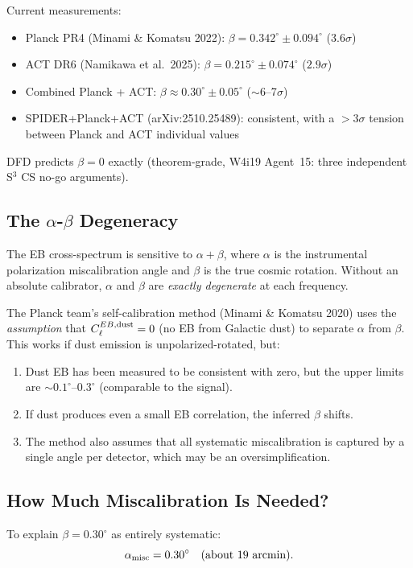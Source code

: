 \documentclass[11pt]{article}
\begin{document}
Current measurements:
\begin{itemize}
\item Planck PR4 (Minami \& Komatsu 2022): $\beta = 0.342^\circ \pm 0.094^\circ$ ($3.6\sigma$)
\item ACT DR6 (Namikawa et al.\ 2025): $\beta = 0.215^\circ \pm 0.074^\circ$ ($2.9\sigma$)
\item Combined Planck + ACT: $\beta \approx 0.30^\circ \pm 0.05^\circ$ ($\sim$6--7$\sigma$)
\item SPIDER+Planck+ACT (arXiv:2510.25489): consistent, with a $>$3$\sigma$ tension between
  Planck and ACT individual values
\end{itemize}

DFD predicts $\beta = 0$ exactly (theorem-grade, W4i19 Agent~15: three
independent S$^3$ CS no-go arguments).

\subsection{The $\alpha$-$\beta$ Degeneracy}

The EB cross-spectrum is sensitive to $\alpha + \beta$, where $\alpha$ is
the instrumental polarization miscalibration angle and $\beta$ is the
true cosmic rotation. Without an absolute calibrator, $\alpha$ and $\beta$
are \emph{exactly degenerate} at each frequency.

The Planck team's self-calibration method (Minami \& Komatsu 2020) uses
the \emph{assumption} that $C_\ell^{EB,\rm dust} = 0$ (no EB from
Galactic dust) to separate $\alpha$ from $\beta$. This works if dust
emission is unpolarized-rotated, but:
\begin{enumerate}
\item Dust EB has been measured to be consistent with zero, but the upper
  limits are $\sim 0.1^\circ$--$0.3^\circ$ (comparable to the signal).
\item If dust produces even a small EB correlation, the inferred $\beta$
  shifts.
\item The method also assumes that all systematic miscalibration is
  captured by a single angle per detector, which may be an oversimplification.
\end{enumerate}

\subsection{How Much Miscalibration Is Needed?}

To explain $\beta = 0.30^\circ$ as entirely systematic:
\begin{equation}
\alpha_{\rm misc} = 0.30^\circ \quad (\text{about 19 arcmin}).
\end{equation}
\end{document}

